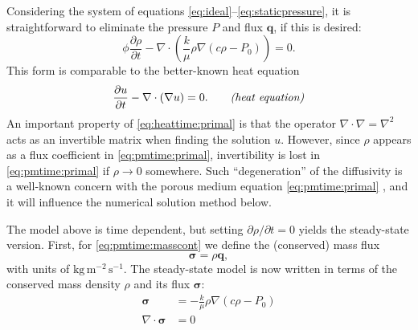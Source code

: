 \documentclass[11pt]{amsart}
\newcommand{\bq}{\mathbf{q}}
\newcommand{\bsigma}{\bm{\sigma}}
\newcommand{\Div}{\nabla\cdot}
\newcommand{\grad}{\nabla}
\begin{document}
Considering the system of equations \eqref{eq:ideal}--\eqref{eq:staticpressure}, it is straightforward to eliminate the pressure $P$ and flux $\bq$, if this is desired:
\begin{equation}
\phi \frac{\partial \rho}{\partial t} - \Div \left(\frac{k}{\mu} \rho \grad\left(c \rho - P_0\right)\right) = 0. \label{eq:pmtime:primal}
\end{equation}
This form is comparable to the better-known heat equation
\begin{equation}
\frac{\partial u}{\partial t} - \Div(\grad u) = 0. \qquad \text{\emph{(heat equation)}}\label{eq:heattime:primal}
\end{equation}
An important property of \eqref{eq:heattime:primal} is that the operator $\Div \grad = \grad^2$ acts as an invertible matrix when finding the solution $u$.  However, since $\rho$ appears as a flux coefficient in \eqref{eq:pmtime:primal}, invertibility is lost in \eqref{eq:pmtime:primal} if $\rho\to 0$ somewhere.  Such ``degeneration'' of the diffusivity is a well-known concern with the porous medium equation \eqref{eq:pmtime:primal} \citep[for example]{Vazquez2007}, and it will influence the numerical solution method below.

The model above is time dependent, but setting $\partial \rho/\partial t = 0$ yields the steady-state version.  First, for \eqref{eq:pmtime:masscont} we define the (conserved) mass flux
\begin{equation}
\bsigma = \rho \bq, \label{eq:massflux}
\end{equation}
with units of $\text{kg}\,\text{m}^{-2}\,\text{s}^{-1}$.  The steady-state model is now written in terms of the conserved mass density $\rho$ and its flux $\bsigma$:
\begin{subequations}
\label{eq:pm:strong}
\begin{align}
\bsigma &= - \frac{k}{\mu} \rho \grad\left(c \rho - P_0\right) \label{eq:darcy} \\
\Div \bsigma &= 0 \label{eq:masscont}
\end{align}
\end{subequations}
\end{document}
